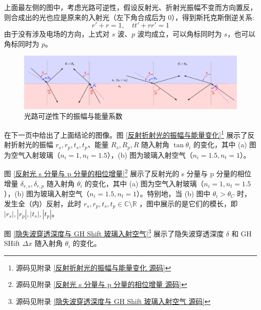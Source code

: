 \documentclass[UTF8]{report}
\def\R{\mathbb{R}}
\def\C{\mathbb{C}}
\theoremstyle{MyLineTheoremStyle} %
\theoremstyle{MyBlockTheoremStyle} %
\theoremstyle{MySubsubsectionStyle} %
\begin{document}
上面最左侧的图中，考虑光路可逆性，假设反射光、折射光振幅不变而方向置反，则合成出的光也应是原来的入射光（左下角合成后为 0），得到斯托克斯倒逆关系: 
\begin{equation}\label{斯托克斯倒逆关系}
r' + r = 1,\quad tt' + rr' = 1
\end{equation}
由于没有涉及电场的方向，上式对 $s$ 波、$p$ 波均成立，可以角标同时为 $s$，也可以角标同时为 $p$。


\begin{figure}[H]\centering
\includegraphics[width=\columnwidth]{assets/3/光路可逆性下的振幅与能量系数.pdf}
\caption{ 光路可逆性下的振幅与能量系数}\label{光路可逆性下的振幅与能量系数}
\end{figure}

在下一页中给出了上面结论的图像。图 \ref{反射折射光的振幅与能量变化}\footnote{源码见附录 \ref{反射折射光的振幅与能量变化 源码}} 展示了反射折射光的振幅 $r_s, r_p, t_s, t_p$、能量 $R_s, R_p, R$ 随入射角 $\tan \theta_i$ 的变化，其中 (a) 图为空气入射玻璃（$n_i = 1, n_t = 1.5$），(b) 图为玻璃入射空气（$n_i = 1.5, n_t = 1$）。

图 \ref{反射光 s 分量与 p 分量的相位增量}\footnote{源码见附录 \ref{反射光 s 分量与 p 分量的相位增量 源码}} 展示了反射光的 s 分量与 p 分量的相位增量 $\delta_{r,s}, \delta_{r,p}$ 随入射角 $\theta_i$ 的变化，其中 (a) 图为空气入射玻璃（$n_i = 1, n_t = 1.5$），(b) 图为玻璃入射空气（$n_i = 1.5, n_t = 1$）。特别地，当 (b) 图中 $\theta_i > \theta_C$ 时，发生全（内）反射，此时 $r_s, r_p, t_s, t_p \in \C \setminus \R$ ，图中展示的是它们的模长，即 $|r_s|, |r_p|, |t_s|, |t_p|$。

图 \ref{隐失波穿透深度与 GH Shift 玻璃入射空气}\footnote{源码见附录 \ref{隐失波穿透深度与 GH Shift 玻璃入射空气 源码}} 展示了隐失波穿透深度 $\delta$ 和 GH SHift $\Delta x$ 随入射角 $\theta_i$ 的变化。
\end{document}
